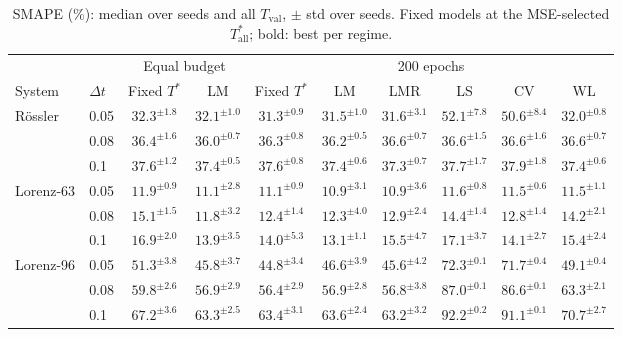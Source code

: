 \begin{table}[htbp]
  \centering
  \caption{SMAPE (\%): median over seeds and all $T_{\mathrm{val}}$, $\pm$ std over seeds. Fixed models at the MSE-selected $T^*_{\mathrm{all}}$; bold: best per regime.}
  \label{tab:smape}
  \footnotesize
  \setlength{\tabcolsep}{3pt}
  \begin{adjustbox}{max width=\textwidth}
  \begin{tabular}{ll cc cccccc}
    \toprule
    & & \multicolumn{2}{c}{Equal budget} & \multicolumn{6}{c}{200 epochs} \\
    \cmidrule(lr){3-4} \cmidrule(lr){5-10}
    System & $\Delta t$ & Fixed $T^*$ & LM & Fixed $T^*$ & LM & LMR & LS & CV & WL \\
    \midrule
    Rössler & 0.05 & $32.3^{\pm 1.8}$ & $\mathbf{32.1}^{\pm 1.0}$ & $\mathbf{31.3}^{\pm 0.9}$ & $31.5^{\pm 1.0}$ & $31.6^{\pm 3.1}$ & $52.1^{\pm 7.8}$ & $50.6^{\pm 8.4}$ & $32.0^{\pm 0.8}$ \\
     & 0.08 & $36.4^{\pm 1.6}$ & $\mathbf{36.0}^{\pm 0.7}$ & $36.3^{\pm 0.8}$ & $\mathbf{36.2}^{\pm 0.5}$ & $36.6^{\pm 0.7}$ & $36.6^{\pm 1.5}$ & $36.6^{\pm 1.6}$ & $36.6^{\pm 0.7}$ \\
     & 0.1 & $37.6^{\pm 1.2}$ & $\mathbf{37.4}^{\pm 0.5}$ & $37.6^{\pm 0.8}$ & $37.4^{\pm 0.6}$ & $\mathbf{37.3}^{\pm 0.7}$ & $37.7^{\pm 1.7}$ & $37.9^{\pm 1.8}$ & $37.4^{\pm 0.6}$ \\
    \midrule
    Lorenz-63 & 0.05 & $11.9^{\pm 0.9}$ & $\mathbf{11.1}^{\pm 2.8}$ & $11.1^{\pm 0.9}$ & $\mathbf{10.9}^{\pm 3.1}$ & $\mathbf{10.9}^{\pm 3.6}$ & $11.6^{\pm 0.8}$ & $11.5^{\pm 0.6}$ & $11.5^{\pm 1.1}$ \\
     & 0.08 & $15.1^{\pm 1.5}$ & $\mathbf{11.8}^{\pm 3.2}$ & $12.4^{\pm 1.4}$ & $\mathbf{12.3}^{\pm 4.0}$ & $12.9^{\pm 2.4}$ & $14.4^{\pm 1.4}$ & $12.8^{\pm 1.4}$ & $14.2^{\pm 2.1}$ \\
     & 0.1 & $16.9^{\pm 2.0}$ & $\mathbf{13.9}^{\pm 3.5}$ & $14.0^{\pm 5.3}$ & $\mathbf{13.1}^{\pm 1.1}$ & $15.5^{\pm 4.7}$ & $17.1^{\pm 3.7}$ & $14.1^{\pm 2.7}$ & $15.4^{\pm 2.4}$ \\
    \midrule
    Lorenz-96 & 0.05 & $51.3^{\pm 3.8}$ & $\mathbf{45.8}^{\pm 3.7}$ & $\mathbf{44.8}^{\pm 3.4}$ & $46.6^{\pm 3.9}$ & $45.6^{\pm 4.2}$ & $72.3^{\pm 0.1}$ & $71.7^{\pm 0.4}$ & $49.1^{\pm 0.4}$ \\
     & 0.08 & $59.8^{\pm 2.6}$ & $\mathbf{56.9}^{\pm 2.9}$ & $\mathbf{56.4}^{\pm 2.9}$ & $56.9^{\pm 2.8}$ & $56.8^{\pm 3.8}$ & $87.0^{\pm 0.1}$ & $86.6^{\pm 0.1}$ & $63.3^{\pm 2.1}$ \\
     & 0.1 & $67.2^{\pm 3.6}$ & $\mathbf{63.3}^{\pm 2.5}$ & $63.4^{\pm 3.1}$ & $63.6^{\pm 2.4}$ & $\mathbf{63.2}^{\pm 3.2}$ & $92.2^{\pm 0.2}$ & $91.1^{\pm 0.1}$ & $70.7^{\pm 2.7}$ \\
    \bottomrule
  \end{tabular}
  \end{adjustbox}
\end{table}
